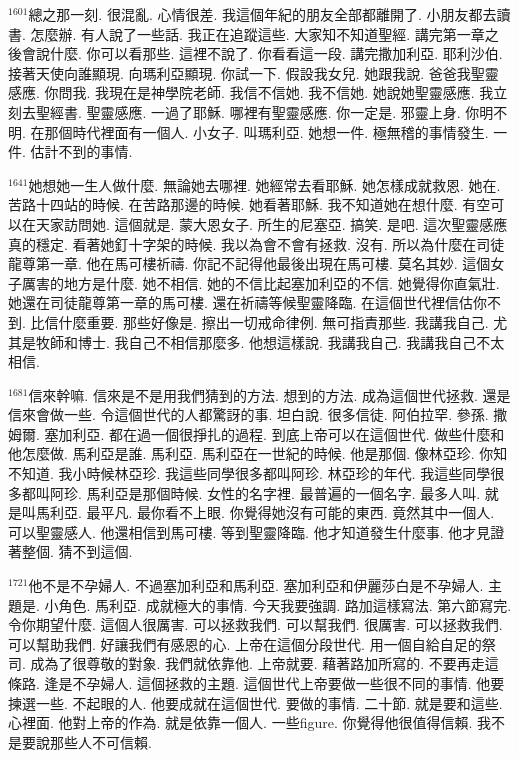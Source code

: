 \documentclass{book}
\begin{document}
$^{1601}$總之那一刻.
很混亂.
心情很差.
我這個年紀的朋友全部都離開了.
小朋友都去讀書.
怎麼辦.
有人說了一些話.
我正在追蹤這些.
大家知不知道聖經.
講完第一章之後會說什麼.
你可以看那些.
這裡不說了.
你看看這一段.
講完撒加利亞.
耶利沙伯.
接著天使向誰顯現.
向瑪利亞顯現.
你試一下.
假設我女兒.
她跟我說.
爸爸我聖靈感應.
你問我.
我現在是神學院老師.
我信不信她.
我不信她.
她說她聖靈感應.
我立刻去聖經書.
聖靈感應.
一過了耶穌.
哪裡有聖靈感應.
你一定是.
邪靈上身.
你明不明.
在那個時代裡面有一個人.
小女子.
叫瑪利亞.
她想一件.
極無稽的事情發生.
一件.
估計不到的事情.

$^{1641}$她想她一生人做什麼.
無論她去哪裡.
她經常去看耶穌.
她怎樣成就救恩.
她在.
苦路十四站的時候.
在苦路那邊的時候.
她看著耶穌.
我不知道她在想什麼.
有空可以在天家訪問她.
這個就是.
蒙大恩女子.
所生的尼塞亞.
搞笑.
是吧.
這次聖靈感應真的穩定.
看著她釘十字架的時候.
我以為會不會有拯救.
沒有.
所以為什麼在司徒龍尊第一章.
他在馬可樓祈禱.
你記不記得他最後出現在馬可樓.
莫名其妙.
這個女子厲害的地方是什麼.
她不相信.
她的不信比起塞加利亞的不信.
她覺得你直氣壯.
她還在司徒龍尊第一章的馬可樓.
還在祈禱等候聖靈降臨.
在這個世代裡信估你不到.
比信什麼重要.
那些好像是.
擦出一切戒命律例.
無可指責那些.
我講我自己.
尤其是牧師和博士.
我自己不相信那麼多.
他想這樣說.
我講我自己.
我講我自己不太相信.

$^{1681}$信來幹嘛.
信來是不是用我們猜到的方法.
想到的方法.
成為這個世代拯救.
還是信來會做一些.
令這個世代的人都驚訝的事.
坦白說.
很多信徒.
阿伯拉罕.
參孫.
撒姆爾.
塞加利亞.
都在過一個很掙扎的過程.
到底上帝可以在這個世代.
做些什麼和他怎麼做.
馬利亞是誰.
馬利亞.
馬利亞在一世紀的時候.
他是那個.
像林亞珍.
你知不知道.
我小時候林亞珍.
我這些同學很多都叫阿珍.
林亞珍的年代.
我這些同學很多都叫阿珍.
馬利亞是那個時候.
女性的名字裡.
最普遍的一個名字.
最多人叫.
就是叫馬利亞.
最平凡.
最你看不上眼.
你覺得她沒有可能的東西.
竟然其中一個人.
可以聖靈感人.
他還相信到馬可樓.
等到聖靈降臨.
他才知道發生什麼事.
他才見證著整個.
猜不到這個.

$^{1721}$他不是不孕婦人.
不過塞加利亞和馬利亞.
塞加利亞和伊麗莎白是不孕婦人.
主題是.
小角色.
馬利亞.
成就極大的事情.
今天我要強調.
路加這樣寫法.
第六節寫完.
令你期望什麼.
這個人很厲害.
可以拯救我們.
可以幫我們.
很厲害.
可以拯救我們.
可以幫助我們.
好讓我們有感恩的心.
上帝在這個分段世代.
用一個自給自足的祭司.
成為了很尊敬的對象.
我們就依靠他.
上帝就要.
藉著路加所寫的.
不要再走這條路.
逢是不孕婦人.
這個拯救的主題.
這個世代上帝要做一些很不同的事情.
他要揀選一些.
不起眼的人.
他要成就在這個世代.
要做的事情.
二十節.
就是要和這些.
心裡面.
他對上帝的作為.
就是依靠一個人.
一些figure.
你覺得他很值得信賴.
我不是要說那些人不可信賴.
\end{document}
